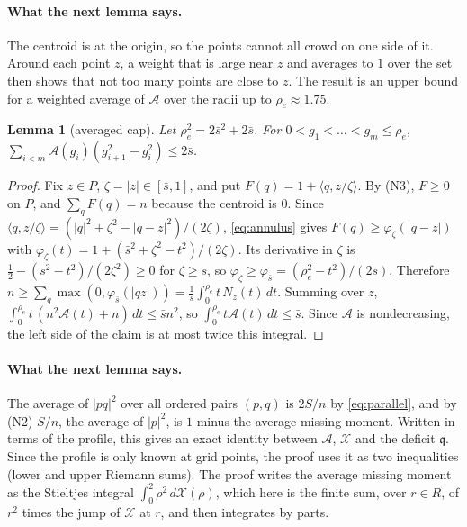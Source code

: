 \documentclass[11pt]{article}
\newcommand{\cA}{\mathcal{A}}
\newcommand{\cX}{\mathcal{X}}
\newcommand{\qq}{\mathfrak{q}}
\newcommand{\sbar}{\bar{s}}
\newtheorem{lemma}[theorem]{Lemma}
\theoremstyle{remark}
\begin{document}
\paragraph{What the next lemma says.} The centroid is at the origin, so
the points cannot all crowd on one side of it. Around each point $z$, a
weight that is large near $z$ and averages to $1$ over the set then shows
that not too many points are close to $z$. The result is an upper bound
for a weighted average of $\cA$ over the radii up to $\rho_e \approx 1.75$.

\begin{lemma}[averaged cap]\label{lem:K}
Let $\rho_e^2 = 2\sbar^2 + 2\sbar$. For $0 < g_1 < \dots < g_m \le \rho_e$,
$\sum_{i<m} \cA(g_i)(g_{i+1}^2 - g_i^2) \le 2\sbar$.
\end{lemma}

\begin{proof}
Fix $z \in P$, $\zeta = |z| \in [\sbar, 1]$, and put
$F(q) = 1 + \langle q, z/\zeta\rangle$. By (N3), $F \ge 0$ on $P$, and
$\sum_q F(q) = n$ because the centroid is $0$. Since
$\langle q, z/\zeta\rangle = (|q|^2 + \zeta^2 - |q-z|^2)/(2\zeta)$,
\eqref{eq:annulus} gives $F(q) \ge \varphi_\zeta(|q-z|)$ with
$\varphi_\zeta(t) = 1 + (\sbar^2 + \zeta^2 - t^2)/(2\zeta)$. Its
derivative in $\zeta$ is $\frac12 - (\sbar^2 - t^2)/(2\zeta^2) \ge 0$
for $\zeta \ge \sbar$, so $\varphi_\zeta \ge \varphi_{\sbar} =
(\rho_e^2 - t^2)/(2\sbar)$. Therefore
$n \ge \sum_q \max(0, \varphi_{\sbar}(|qz|)) =
\frac1{\sbar}\int_0^{\rho_e} t\,N_z(t)\,dt$. Summing over $z$,
$\int_0^{\rho_e} t\,(n^2\cA(t) + n)\,dt \le \sbar n^2$, so
$\int_0^{\rho_e} t\cA(t)\,dt \le \sbar$. Since $\cA$ is nondecreasing, the
left side of the claim is at most twice this integral.
\end{proof}

\paragraph{What the next lemma says.} The average of $|pq|^2$ over all ordered pairs $(p,q)$ is $2S/n$ by \eqref{eq:parallel}, and by (N2) $S/n$, the average of $|p|^2$, is $1$ minus the average missing moment. Written in terms of the profile, this gives an exact identity
between $\cA$, $\cX$ and the deficit $\qq$. Since the profile is only known
at grid points, the proof uses it as two inequalities (lower and upper Riemann sums). The proof writes the average missing moment as the Stieltjes integral $\int_0^2 \rho^2\,d\cX(\rho)$, which here is the finite sum, over $r \in R$, of $r^2$ times the jump of $\cX$ at $r$, and then integrates by parts.
\end{document}
